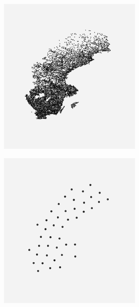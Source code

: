 \begin{figure}[!h]
\begin{subfigure}[b]{1.0\linewidth}
\begin{subfigure}[t]{0.30\linewidth}
		\vspace{2ex}
	\end{subfigure}
	\begin{subfigure}[t]{0.30\linewidth}
		\centering
		\includegraphics[width=0.9\linewidth]{Pictures/bp5_1_sweden}
		\vspace{2ex}
	\end{subfigure}
\end{subfigure}
\begin{subfigure}[b]{1.0\linewidth}
	\centering
  \begin{subfigure}[b]{0.30\linewidth}
  	\centering
  	\includegraphics[width=0.9\linewidth]{Pictures/ls_10_sweden} 

\end{subfigure}
\end{subfigure}
\end{figure}
